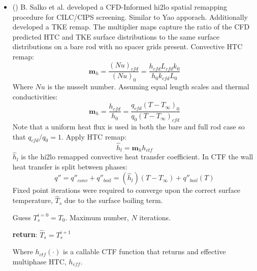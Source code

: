 \begin{itemize}
    \item (\checkmark) B. Salko et al. developed a CFD-Informed hi2lo spatial remapping procedure for CILC/CIPS screening. \cite{salko17}
    Similar to Yao apporach.  Additionally developed a TKE remap.
    The multiplier maps capture the ratio of the CFD predicted HTC and TKE surface distributions to the same surface distributions on a bare rod with no spacer grids present.
    Convective HTC remap:
    \begin{equation}
        \mathbf m_h = \frac{(Nu)_{cfd}}{(Nu)_{0}} = \frac{h_{cfd} L_{cfd} k_{0} }{h_{0}k_{cfd} L_{0}}
    \end{equation}
    Where $Nu$ is the nusselt number.  Assuming equal length scales and thermal conductivities:
    \begin{equation}
        \mathbf m_h = \frac{h_{cfd}}{h_{0}} = \frac{q_{cfd}(T-T_\infty)_{0}}{q_{0}(T-T_\infty)_{cfd}}
    \end{equation}
    Note that a uniform heat flux is used in both the bare and full rod case so that $q_{cfd}/q_0 =1 $.
    Apply HTC remap:
    \begin{equation}
        \hat h_{l} = \mathbf m_h h_{ctf}
    \end{equation}
    $\hat h_l$ is the hi2lo remapped convective heat transfer coefficient.  In CTF the wall heat transfer is split between phases:
    \begin{equation}
        q'' = q''_{conv} + q''_{boil} = (\hat h_l)(T-T_{\infty}) + q''_{boil}(T)
    \end{equation}
    Fixed point iterations were required to converge upon the correct surface temperature, $\hat T_s$ due to the surface boiling term.

    \begin{algorithm}[H]
    Guess $T^{i=0}_s=T_0$.  Maximum number, $N$ iterations.

        \textbf{return}: $\hat T_s = T^{i+1}_s$
        \end{algorithm}
    Where $h_{ctf}(\cdot)$ is a callable CTF function that returns and effective multiphase HTC, $h_{eff}$.


\end{itemize}
